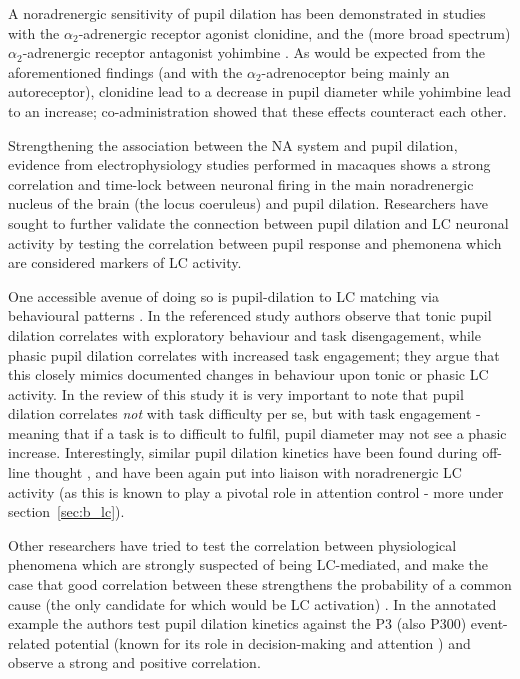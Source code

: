 	A noradrenergic sensitivity of pupil dilation has been demonstrated in studies with the $\alpha_2$-adrenergic receptor agonist clonidine, and the (more broad spectrum) $\alpha_2$-adrenergic receptor antagonist yohimbine \citep{Phillips2000}. 
	As would be expected from the aforementioned findings (and with the $\alpha_2$-adrenoceptor being mainly an autoreceptor), clonidine lead to a decrease in pupil diameter while yohimbine lead to an increase; co-administration showed that these effects counteract each other.
	
	Strengthening the association between the NA system and pupil dilation, evidence from electrophysiology studies performed in macaques \citep{Rajkowski1994} shows a strong correlation and time-lock between neuronal firing in the main noradrenergic nucleus of the brain (the locus coeruleus) and pupil dilation.
	Researchers have sought to further validate the connection between pupil dilation and LC neuronal activity by testing the correlation between pupil response and phemonena which are considered markers of LC activity.
	
	One accessible avenue of doing so is pupil-dilation to LC matching via behavioural patterns \citep{Gilzenrat2010}.
	In the referenced study authors observe that tonic pupil dilation correlates with exploratory behaviour and task disengagement, while phasic pupil dilation correlates with increased task engagement; they argue that this closely mimics documented \citep{Aston-Jones2005} changes in behaviour upon tonic or phasic LC activity.
	In the review of this study it is very important to note that pupil dilation correlates \textit{not} with task difficulty per se, but with task engagement - meaning that if a task is to difficult to fulfil, pupil diameter may not see a phasic increase.
	Interestingly, similar pupil dilation kinetics have been found during off-line thought \citep{Smallwood2011}, and have been again put into liaison with noradrenergic LC activity (as this is known to play a pivotal role in attention control - more under section~\ref{sec:b_lc}).   
	
	Other researchers have tried to test the correlation between physiological phenomena which are strongly suspected of being LC-mediated, and make the case that good correlation between these strengthens the probability of a common cause (the only candidate for which would be LC activation) \citep{Murphy2011}.
	In the annotated example the authors test pupil dilation kinetics against the P3 (also P300) event-related potential (known for its role in decision-making \citep{CHAPMAN1964} and attention \citep{Picton19992}) and observe a strong and positive correlation.
	
